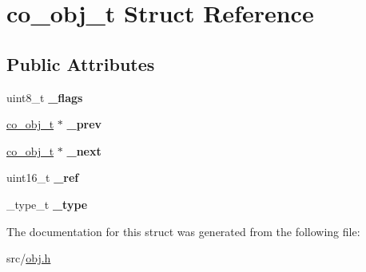 \hypertarget{structco__obj__t}{\section{co\-\_\-obj\-\_\-t Struct Reference}
\label{structco__obj__t}
}
\subsection*{Public Attributes}
\begin{DoxyCompactItemize}
\item 
\hypertarget{structco__obj__t_a4d8626e624751a210bf831620c1a6f0b}{uint8\-\_\-t {\bfseries \-\_\-flags}}\label{structco__obj__t_a4d8626e624751a210bf831620c1a6f0b}

\item 
\hypertarget{structco__obj__t_a2b02f1ab03451cba6ff25879e5da5c81}{\hyperlink{structco__obj__t}{co\-\_\-obj\-\_\-t} $\ast$ {\bfseries \-\_\-prev}}\label{structco__obj__t_a2b02f1ab03451cba6ff25879e5da5c81}

\item 
\hypertarget{structco__obj__t_a730bd99f3fea72a2368c557b3d618c86}{\hyperlink{structco__obj__t}{co\-\_\-obj\-\_\-t} $\ast$ {\bfseries \-\_\-next}}\label{structco__obj__t_a730bd99f3fea72a2368c557b3d618c86}

\item 
\hypertarget{structco__obj__t_a1aa12ce777f1749d57145526e1b94e54}{uint16\-\_\-t {\bfseries \-\_\-ref}}\label{structco__obj__t_a1aa12ce777f1749d57145526e1b94e54}

\item 
\hypertarget{structco__obj__t_a190bb62df2e9fed4b3d67177d03dda0d}{\-\_\-type\-\_\-t {\bfseries \-\_\-type}}\label{structco__obj__t_a190bb62df2e9fed4b3d67177d03dda0d}

\end{DoxyCompactItemize}


The documentation for this struct was generated from the following file\-:\begin{DoxyCompactItemize}
\item 
src/\hyperlink{obj_8h}{obj.\-h}\end{DoxyCompactItemize}
